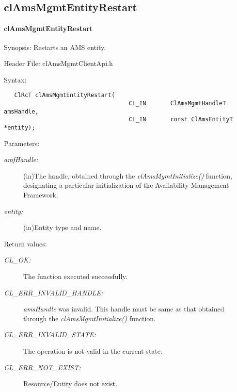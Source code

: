 \subsection{clAmsMgmtEntityRestart}
\hypertarget{pageams114}{}\paragraph{cl\-Ams\-Mgmt\-Entity\-Restart}\label{pageams114}
\begin{Desc}
\item[Synopsis:]Restarts an AMS entity.\end{Desc}
\begin{Desc}
\item[Header File:]clAmsMgmtClientApi.h\end{Desc}
\begin{Desc}
\item[Syntax:]

\footnotesize\begin{verbatim}   ClRcT clAmsMgmtEntityRestart(
                               		CL_IN       ClAmsMgmtHandleT            amsHandle,
                               		CL_IN       const ClAmsEntityT          *entity);
\end{verbatim}
\normalsize
\end{Desc}
\begin{Desc}
\item[Parameters:]
\begin{description}
\item[{\em amf\-Handle:}](in)The handle, obtained through the \textit{cl\-Ams\-Mgmt\-Initialize()} function, designating a particular initialization of 
the Availability Management Framework. \item[{\em entity:}](in)Entity type and name.\end{description}
\end{Desc}
\begin{Desc}
\item[Return values:]
\begin{description}
\item[{\em CL\_\-OK:}]The function executed successfully. \item[{\em CL\_\-ERR\_\-INVALID\_\-HANDLE:}]{\em ams\-Handle\/} was invalid. 
This handle must be same as that obtained through the \textit{clAmsMgmtInitialize()} function. 
\item[{\em CL\_\-ERR\_\-INVALID\_\-STATE:}]The operation is not valid in the current state. \item[{\em CL\_\-ERR\_\-NOT\_\-EXIST:}]Resource/Entity does not exist.\end{description}
\end{Desc}
